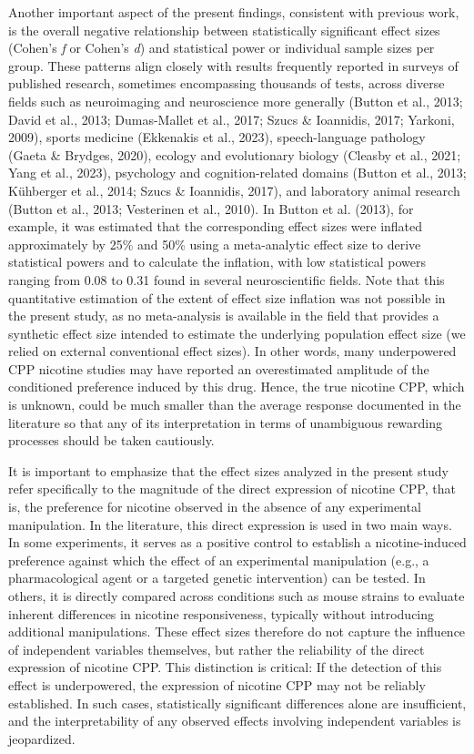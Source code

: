 \documentclass[authordate, meta]{jote-new-article}
\begin{document}
	Another important aspect of the present findings, consistent with previous work, is the overall negative relationship between statistically significant effect sizes (Cohen's \emph{f} or Cohen's \emph{d}) and statistical power or individual sample sizes per group. These patterns align closely with results frequently reported in surveys of published research, sometimes encompassing thousands of tests, across diverse fields such as neuroimaging and neuroscience more generally (Button et al., 2013; David et al., 2013; Dumas-Mallet et al., 2017; Szucs \& Ioannidis, 2017; Yarkoni, 2009), sports medicine (Ekkenakis et al., 2023), speech-language pathology (Gaeta \& Brydges, 2020), ecology and evolutionary biology (Cleasby et al., 2021; Yang et al., 2023), psychology and cognition-related domains (Button et al., 2013; Kühberger et al., 2014; Szucs \& Ioannidis, 2017), and laboratory animal research (Button et al., 2013; Vesterinen et al., 2010). In Button et al. (2013), for example, it was estimated that the corresponding effect sizes were inflated approximately by 25\% and 50\% using a meta-analytic effect size to derive statistical powers and to calculate the inflation, with low statistical powers ranging from 0.08 to 0.31 found in several neuroscientific fields. Note that this quantitative estimation of the extent of effect size inflation was not possible in the present study, as no meta-analysis is available in the field that provides a synthetic effect size intended to estimate the underlying population effect size (we relied on external conventional effect sizes). In other words, many underpowered CPP nicotine studies may have reported an overestimated amplitude of the conditioned preference induced by this drug. Hence, the true nicotine CPP, which is unknown, could be much smaller than the average response documented in the literature so that any of its interpretation in terms of unambiguous rewarding processes should be taken cautiously.



	It is important to emphasize that the effect sizes analyzed in the present study refer specifically to the magnitude of the direct expression of nicotine CPP, that is, the preference for nicotine observed in the absence of any experimental manipulation. In the literature, this direct expression is used in two main ways. In some experiments, it serves as a positive control to establish a nicotine-induced preference against which the effect of an experimental manipulation (e.g., a pharmacological agent or a targeted genetic intervention) can be tested. In others, it is directly compared across conditions such as mouse strains to evaluate inherent differences in nicotine responsiveness, typically without introducing additional manipulations. These effect sizes therefore do not capture the influence of independent variables themselves, but rather the reliability of the direct expression of nicotine CPP. This distinction is critical: If the detection of this effect is underpowered, the expression of nicotine CPP may not be reliably established. In such cases, statistically significant differences alone are insufficient, and the interpretability of any observed effects involving independent variables is jeopardized.
\end{document}
